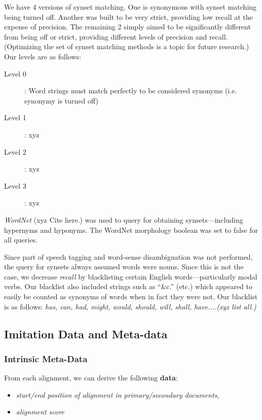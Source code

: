 We have 4 versions of synset matching. One is synonymous with synset matching being turned off. Another was built to be very strict, providing low recall at the expense of precision. The remaining 2 simply aimed to be significantly different from being off or strict, providing different levels of precision and recall. (Optimizing the set of synset matching methods is a topic for future research.) Our levels are as follows:

\begin{description}
	\item [Level 0]: Word strings must match perfectly to be considered synonyms (i.e. synonymy is turned off)
	\item [Level 1]: xyz
	\item [Level 2]: xyz
	\item [Level 3]: xyz
\end{description}


\textit{WordNet} (xyz Cite here.) was used to query for obtaining synsets---including hypernyms and hyponyms. The WordNet morphology boolean was set to false for all queries. 

Since part of speech tagging and word-sense disambiguation was not performed, the query for synsets always assumed words were nouns. Since this is not the case, we decrease \textit{recall} by blacklisting certain English words---particularly modal verbs. Our blacklist also included strings such as ``\&c.'' (etc.) which appeared to easily be counted as synonyms of words when in fact they were not. Our blacklist is as follows: \textit{has, can, had, might, would, should, will, shall, have....(xyz list all.)}


\subsection{Imitation Data and Meta-data}

\subsubsection{Intrinsic Meta-Data}
From each alignment, we can derive the following \textbf{data}:
	\begin{itemize}
		\item \textit{start/end position of alignment in primary/secondary documents},
		\item \textit{alignment score}
	\end{itemize}

